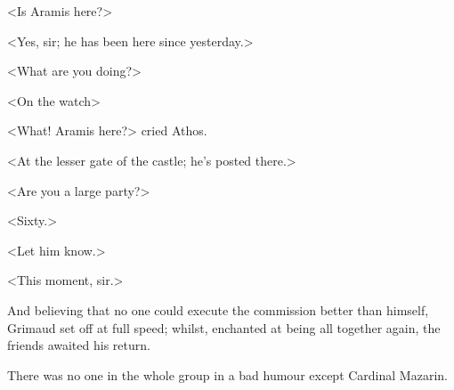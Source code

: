 <Is Aramis here?>

<Yes, sir; he has been here since yesterday.>

<What are you doing?>

<On the watch\longdash>

<What! Aramis here?> cried Athos.

<At the lesser gate of the castle; he's posted there.>

<Are you a large party?>

<Sixty.>

<Let him know.>

<This moment, sir.>

And believing that no one could execute the commission better than himself, Grimaud set off at full speed; whilst, enchanted at being all together again, the friends awaited his return.

There was no one in the whole group in a bad humour except Cardinal Mazarin. 
